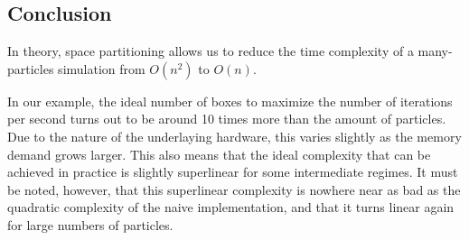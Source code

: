 \subsection{Conclusion}
In theory, space partitioning allows us to reduce the time complexity of a 
many-particles simulation from $O(n^2)$ to $O(n)$.

In our example, the ideal number of boxes to maximize the number of 
iterations per second turns out to be around 10 times more than the amount 
of particles. Due to the nature of the underlaying hardware, this varies 
slightly as the memory demand grows larger. This also means that the ideal 
complexity that can be achieved in practice is slightly superlinear for 
some intermediate regimes.  It must be noted, however, that this 
superlinear complexity is nowhere near as bad as the quadratic complexity of 
the naive implementation, and that it turns linear again for large numbers of 
particles.



